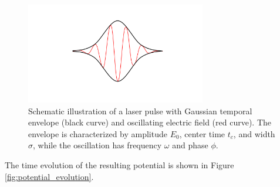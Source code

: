 \documentclass{article}
\theoremstyle{definition}
\theoremstyle{plain}
\theoremstyle{remark}
\begin{document}
\begin{figure}[h]
  \centering
  \includegraphics[width=0.7\textwidth,trim=2cm 2cm 2cm 2cm,clip]{figures/Figure3.pdf}
  \caption{Schematic illustration of a laser pulse with Gaussian temporal envelope (black curve) and oscillating electric field (red curve). The envelope is characterized by amplitude $E_0$, center time $t_c$, and width $\sigma$, while the oscillation has frequency $\omega$ and phase $\phi$.}
  \label{fig:laser_pulse}
\end{figure}

The time evolution of the resulting potential is shown in Figure \ref{fig:potential_evolution}.
\end{document}
